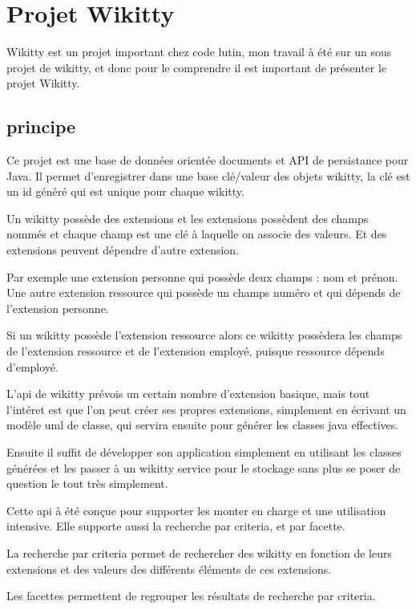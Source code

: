 \section{Projet Wikitty}

Wikitty est un projet important chez code lutin, mon travail à été sur un sous
projet de wikitty, et donc pour le comprendre il est important de présenter
le projet Wikitty.


\subsection{principe}

Ce projet est une base de données orientée documents et API de persistance pour
Java. Il permet d'enregistrer dans une base clé/valeur des objets wikitty, la
clé est un id généré qui est unique pour chaque wikitty.

Un wikitty possède des extensions et les extensions possèdent des champs nommés
et chaque champ est une clé à laquelle on associe des valeurs. Et des extensions
peuvent dépendre d'autre extension.

Par exemple une extension personne qui possède deux champs : nom et prénon.
Une autre extension ressource qui possède un champs numéro et qui dépends de
l'extension personne.

Si un wikitty possède l'extension ressource alors ce wikitty possèdera les
champs de l'extension ressource et de l'extension employé, puisque ressource
dépends d'employé.

L'api de wikitty prévois un certain nombre d'extension basique, mais tout
l'intéret est que l'on peut créer ses propres extensions, simplement en écrivant
un modèle uml de classe, qui servira ensuite pour générer les classes java
effectives.

Ensuite il suffit de développer son application simplement en utilisant les
classes générées et les passer à un wikitty service pour le stockage sans plus
se poser de question le tout très simplement.

Cette api à été conçue pour supporter les monter en charge et une utilisation
intensive. Elle supporte aussi la recherche par criteria, et par facette.

La recherche par criteria permet de rechercher des wikitty en fonction de leurs
extensions et des valeurs des différents éléments de ces extensions.

Les facettes permettent de regrouper les résultats de recherche par criteria. 

